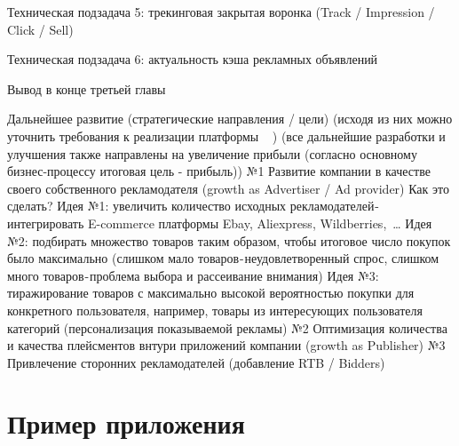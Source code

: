 \documentclass[specification,annotation,times]{itmo-student-thesis}
\begin{document}
Техническая подзадача 5: трекинговая закрытая воронка (Track / Impression / Click / Sell)

Техническая подзадача 6: актуальность кэша рекламных объявлений


\chapterconclusion

Вывод в конце третьей главы

\startconclusionpage

Дальнейшее развитие (стратегические направления / цели) (исходя из них можно уточнить требования к реализации платформы 🤔 )
(все дальнейшие разработки и улучшения также направлены на увеличение прибыли (согласно основному бизнес-процессу итоговая цель - прибыль))
№1 Развитие компании в качестве своего собственного рекламодателя (growth as Advertiser / Ad provider)
Как это сделать?
Идея №1: увеличить количество исходных рекламодателей - интегрировать E-commerce платформы Ebay, Aliexpress, Wildberries, …
Идея №2: подбирать множество товаров таким образом, чтобы итоговое число покупок было максимально (слишком мало товаров - неудовлетворенный спрос, слишком много товаров - проблема выбора и рассеивание внимания)
Идея №3: тиражирование товаров с максимально высокой вероятностью покупки для конкретного пользователя, например, товары из интересующих пользователя категорий (персонализация показываемой рекламы)
№2 Оптимизация количества и качества плейсментов внтури приложений компании (growth as Publisher)
№3 Привлечение сторонних рекламодателей (добавление RTB / Bidders)

\printmainbibliography

\appendix

\chapter{Пример приложения}\label{sec:app:1}
                
\end{document}
